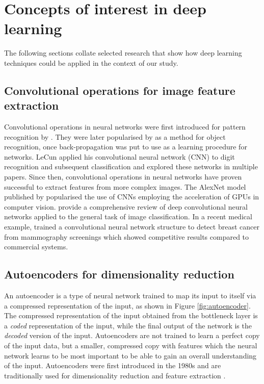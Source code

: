 \section{Concepts of interest in deep learning} \label{sec:deepl_bg}

The following sections collate selected research that show how deep learning techniques could be applied in the context of our study.

\subsection{Convolutional operations for image feature extraction}

Convolutional operations in neural networks were first introduced for pattern recognition by \citet{fukushima_neocognitron_1980}. They were later popularised by \citet{lecun_1989} as a method for object recognition, once back-propagation was put to use as a learning procedure for networks. LeCun applied his convolutional neural network (CNN) to digit recognition and subsequent classification and explored these networks in multiple papers. Since then, convolutional operations in neural networks have proven successful to extract features from more complex images. The AlexNet model published by \citet{krizhevsky_imagenet_2012} popularised the use of CNNs employing the acceleration of GPUs in computer vision. \citet{rawat_deep_2017} provide a comprehensive review of deep convolutional neural networks applied to the general task of image classification. In a recent medical example, \citet{shen_2019} trained a convolutional neural network structure to detect breast cancer from mammography screenings which showed competitive results compared to commercial systems.

\subsection{Autoencoders for dimensionality reduction}

An autoencoder is a type of neural network trained to map its input to itself via a compressed representation of the input, as shown in Figure \ref{fig:autoencoder}. The compressed representation of the input obtained from the bottleneck layer is a \textit{coded} representation of the input, while the final output of the network is the \textit{decoded} version of the input. Autoencoders are not trained to learn a perfect copy of the input data, but a smaller, compressed copy with features which the neural network learns to be most important to be able to gain an overall understanding of the input. Autoencoders were first introduced in the 1980s \citep{rumelhart_1986} and are traditionally used for dimensionality reduction and feature extraction \citep{Goodfellow-et-al-2016}.

